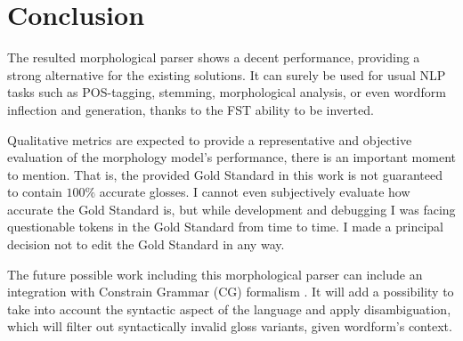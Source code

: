 \section{Conclusion}
The resulted morphological parser shows a decent performance, providing a strong alternative for the existing solutions. It can surely be used for usual NLP tasks such as POS-tagging, stemming, morphological analysis, or even wordform inflection and generation, thanks to the FST ability to be inverted. 

Qualitative metrics are expected to provide a representative and objective evaluation of the morphology model's performance, there is an important moment to mention. That is, the provided Gold Standard in this work is not guaranteed to contain $100\%$ accurate glosses. I cannot even subjectively evaluate how accurate the Gold Standard is, but while development and debugging I was facing questionable tokens in the Gold Standard from time to time. I made a principal decision not to edit the Gold Standard in any way.

The future possible work including this morphological parser can include an integration with Constrain Grammar (CG) formalism \parencite{karlsson_1995_cg}. It will add a possibility to take into account the syntactic aspect of the language and apply disambiguation, which will filter out syntactically invalid gloss variants, given wordform's context.